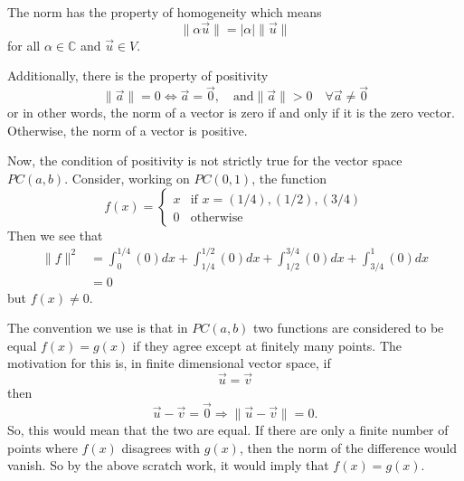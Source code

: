 The norm has the property of
homogeneity which means
\begin{equation}
\|\alpha\vec{u}\| = |\alpha|\|\vec{u}\|
\end{equation}
for all $\alpha\in\mathbb{C}$ and $\vec{u}\in V$.

Additionally, there is the property of
positivity
\begin{equation}
\|\vec{a}\|=0\iff \vec{a}=\vec{0},\quad\text{and
}\|\vec{a}\|>0\quad\forall\vec{a}\neq\vec{0}
\end{equation}
or in other words, the norm of a vector is zero if and only
if it is the zero vector. Otherwise, the norm of a vector is positive.

Now, the condition of positivity is not strictly true for
the vector space $PC(a,b)$. Consider, working on $PC(0,1)$,
the function
\begin{equation}
f(x) = \begin{cases} x & \text{if }x=(1/4),(1/2),(3/4) \\
0 & \text{otherwise}
\end{cases}
\end{equation}
Then we see that
\begin{subequations}
\begin{align}
\|f\|^2 &= \int^{1/4}_{0}(0)dx + \int^{1/2}_{1/4}(0)dx +
\int^{3/4}_{1/2}(0)dx + \int^{1}_{3/4}(0)dx \\
&= 0
\end{align}
\end{subequations}
but $f(x)\neq 0$. 

The convention we use is that in $PC(a,b)$ two functions are
considered to be equal $f(x)=g(x)$ if they agree except at
finitely many points. The motivation for this is, in finite
dimensional vector space, if
\begin{equation}
\vec{u}=\vec{v}
\end{equation}
then
\begin{equation}
\vec{u}-\vec{v}=\vec{0}\Rightarrow\|\vec{u}-\vec{v}\|=0.
\end{equation}
So, this would mean that the two are equal. If there are
only a finite number of points where $f(x)$ disagrees with
$g(x)$, then the norm of the difference would vanish. So by
the above scratch work, it would imply that $f(x)=g(x)$.

